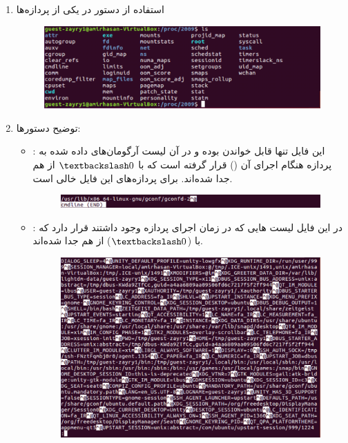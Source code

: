 \newpage
{}

\begin{enumerate}
	\item 
	استفاده از دستور  در یکی از پردازه‌ها
	
	\begin{figure}[h!]
		\centering
		\includegraphics[scale=.4]{img/:proc:[pid].png}
	\end{figure}

	\item
توضیح	دستورها:
	\begin{itemize}
		\item \textbf{}:
  این فایل تنها قابل خواندن بوده و در آن لیست آرگومان‌های داده شده به پردازه هنگام اجرای آن () قرار گرفته است که با $\textbackslash 0$ از هم جدا شده‌اند. برای پردازه‌های  این فایل خالی است.
  
  \begin{figure}[h!]
  	\centering
  	\includegraphics[scale=.4]{img/cmdline.png}
  \end{figure}
  
  		\item \textbf{}:
  		 در این فایل لیست هایی که در زمان اجرای پردازه وجود داشتند قرار دارد که با ($\textbackslash 0$) از هم جدا شده‌اند.
  		 \begin{figure}[h!]
  		 	\centering
  		 	\includegraphics[scale=.4]{img/environ.png}
  		 \end{figure}
  	 

\end{itemize}
\end{enumerate}
